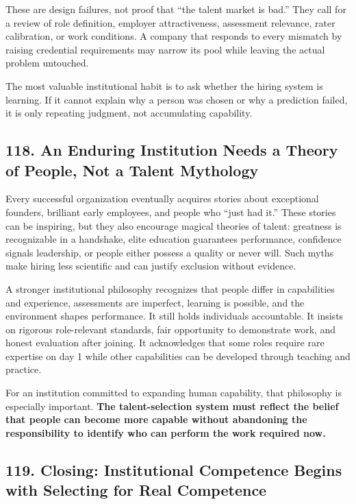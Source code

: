 These are design failures, not proof that ``the talent market is bad.'' They call for a review of role definition, employer attractiveness, assessment relevance, rater calibration, or work conditions. A company that responds to every mismatch by raising credential requirements may narrow its pool while leaving the actual problem untouched.

The most valuable institutional habit is to ask whether the hiring system is learning. If it cannot explain why a person was chosen or why a prediction failed, it is only repeating judgment, not accumulating capability.

\subsection*{118. An Enduring Institution Needs a Theory of People, Not a Talent Mythology}

Every successful organization eventually acquires stories about exceptional founders, brilliant early employees, and people who ``just had it.'' These stories can be inspiring, but they also encourage magical theories of talent: greatness is recognizable in a handshake, elite education guarantees performance, confidence signals leadership, or people either possess a quality or never will. Such myths make hiring less scientific and can justify exclusion without evidence.

A stronger institutional philosophy recognizes that people differ in capabilities and experience, assessments are imperfect, learning is possible, and the environment shapes performance. It still holds individuals accountable. It insists on rigorous role-relevant standards, fair opportunity to demonstrate work, and honest evaluation after joining. It acknowledges that some roles require rare expertise on day 1 while other capabilities can be developed through teaching and practice.

For an institution committed to expanding human capability, that philosophy is especially important. \textbf{The talent-selection system must reflect the belief that people can become more capable without abandoning the responsibility to identify who can perform the work required now.}

\subsection*{119. Closing: Institutional Competence Begins with Selecting for Real Competence}

